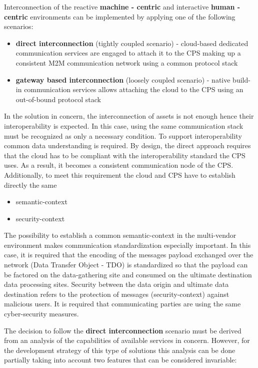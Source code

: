 \documentclass{jacsart}
\begin{document}
Interconnection of the reactive \textbf{machine - centric} and interactive \textbf{human - centric} environments can be implemented by applying one of the following scenarios:

\begin{itemize}
      \item \textbf{direct interconnection} (tightly coupled scenario) - cloud-based dedicated communication services are engaged to attach it to the CPS making up a consistent M2M communication network using a common protocol stack
      \item \textbf{gateway based interconnection} (loosely coupled scenario) - native build-in communication services allows attaching the cloud to the CPS using an out-of-bound protocol stack
\end{itemize}

In the solution in concern, the interconnection of assets is not enough hence their interoperability is expected. In this case, using the same communication stack must be recognized as only a necessary condition. To support interoperability common data understanding is required. By design, the direct approach requires that the cloud has to be compliant with the interoperability standard the CPS uses. As a result, it becomes a consistent communication node of the CPS. Additionally, to meet this requirement the cloud and CPS have to establish directly the same

\begin{itemize}
      \item semantic-context
      \item security-context
\end{itemize}

The possibility to establish a common semantic-context in the multi-vendor environment makes communication standardization especially important. In this case, it is required that the encoding of the messages payload exchanged over the network (Data Transfer Object - TDO) is standardized so that the payload can be factored on the data-gathering site and consumed on the ultimate destination data processing sites. Security between the data origin and ultimate data destination refers to the protection of messages (security-context) against malicious users. It is required that communicating parties are using the same cyber-security measures.

The decision to follow the \textbf{direct interconnection} scenario must be derived from an analysis of the capabilities of available services in concern. However, for the development strategy of this type of solutions this analysis can be done partially taking into account two features that can be considered invariable:
\end{document}
